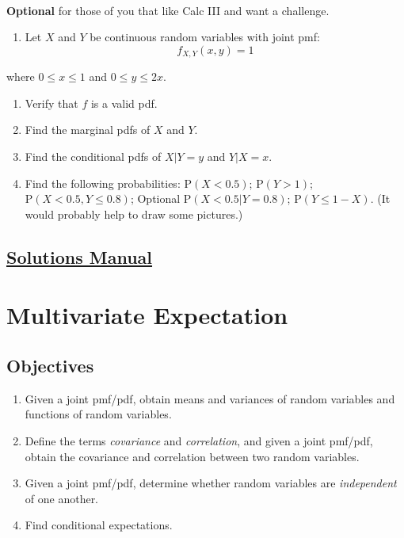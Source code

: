 \documentclass[
  letterpaper,
  DIV=11,
  numbers=noendperiod]{scrreprt}
\providecommand{\tightlist}{%
  \setlength{\itemsep}{0pt}\setlength{\parskip}{0pt}}\usepackage{longtable,booktabs,array}
\begin{document}
~

\textbf{Optional} for those of you that like Calc III and want a
challenge.

\begin{enumerate}
\def\labelenumi{\arabic{enumi}.}
\setcounter{enumi}{3}
\tightlist
\item
  Let \(X\) and \(Y\) be continuous random variables with joint pmf: \[
  f_{X,Y}(x,y)=1
  \]
\end{enumerate}

where \(0 \leq x \leq 1\) and \(0 \leq y \leq 2x\).

\begin{enumerate}
\def\labelenumi{\alph{enumi}.}
\tightlist
\item
  Verify that \(f\) is a valid pdf.\\
\item
  Find the marginal pdfs of \(X\) and \(Y\).\\
\item
  Find the conditional pdfs of \(X|Y=y\) and \(Y|X=x\).\\
\item
  Find the following probabilities: \(\mbox{P}(X<0.5)\);
  \(\mbox{P}(Y>1)\); \(\mbox{P}(X<0.5,Y\leq 0.8)\); Optional
  \(\mbox{P}(X<0.5|Y= 0.8)\); \(\mbox{P}(Y\leq 1-X)\). (It would
  probably help to draw some pictures.)
\end{enumerate}

\section*{\texorpdfstring{\href{https://ds-usafa.github.io/CPS-Solutions-Manual/MULTIDISTS.html}{Solutions
Manual}}{Solutions Manual}}\label{solutions-manual-14}


\chapter{Multivariate Expectation}\label{MULTIEXP}

\section{Objectives}\label{objectives-15}

\begin{enumerate}
\def\labelenumi{\arabic{enumi})}
\item
  Given a joint pmf/pdf, obtain means and variances of random variables
  and functions of random variables.
\item
  Define the terms \emph{covariance} and \emph{correlation}, and given a
  joint pmf/pdf, obtain the covariance and correlation between two
  random variables.
\item
  Given a joint pmf/pdf, determine whether random variables are
  \emph{independent} of one another.
\item
  Find conditional expectations.
\end{enumerate}
\end{document}
